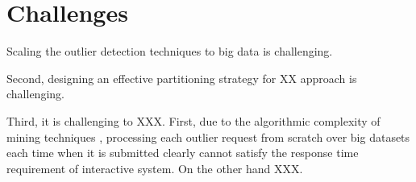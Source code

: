 
\section{Challenges}
\label{sec.challenge}

Scaling the outlier detection techniques to big data is challenging.


Second, designing an effective partitioning strategy for XX approach is challenging. 

Third, it is challenging to XXX.  First, due to the algorithmic complexity of mining techniques \cite{Han:2011:DMC:1972541}, processing each outlier request from scratch over big datasets each time when it is submitted clearly cannot satisfy the response time requirement of interactive system. On the other hand XXX. 
